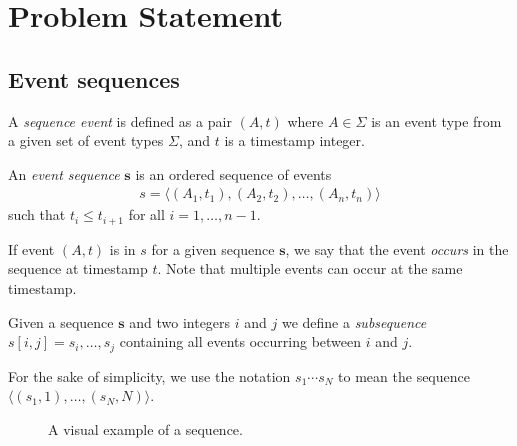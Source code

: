 \section{Problem Statement}

\subsection{Event sequences}

\begin{definition}
A \emph{sequence event} is defined as a pair $ (A, t) $ where $ A \in \Sigma $ is an event type from a given set of event types $ \Sigma $, and $ t $ is a timestamp integer.
\end{definition}

\begin{definition}
An \emph{event sequence} $ \boldsymbol{s} $ is an ordered sequence of events
\begin{align*}
s = \langle (A_1, t_1), (A_2, t_2), \ldots, (A_n, t_n) \rangle
\end{align*}
such that $ t_i \leq t_{i + 1} $ for all $ i = 1, \ldots, n - 1 $.
\end{definition}

If event $ (A, t) $ is in $ s $ for a given sequence $ \boldsymbol{s} $, we say that the event \emph{occurs} in the sequence at timestamp $ t $. Note that multiple events can occur at the same timestamp.

Given a sequence $ \boldsymbol{s} $ and two integers $ i $ and $ j $ we define a \emph{subsequence} $ s[i, j] = s_i, \ldots, s_j $ containing all events occurring between $ i $ and $ j $.

For the sake of simplicity, we use the notation $ s_1 \cdots s_N $ to mean the sequence $ \langle (s_1, 1), \ldots, (s_N, N) \rangle $.

\begin{figure}
\centering


\caption{A visual example of a sequence.}

\end{figure}


